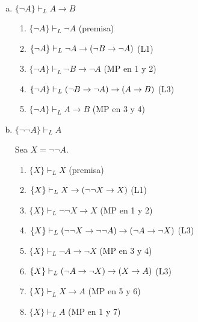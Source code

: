 \begin{enumerate}[(a)]
    \item $\{ \neg A \} \vdash_L A \to B$
    \begin{solution}
    \leavevmode
    \begin{enumerate}[1.]
        \item $\{ \neg A \} \vdash_L                 \neg A$  \hfill (premisa)
        \item $\{ \neg A \} \vdash_L \neg A \to (\neg B \to \neg A)$ \hfill (L1)
        \item $\{ \neg A \} \vdash_L      \neg B \to \neg A$  \hfill (MP en 1 y 2)
        \item $\{ \neg A \} \vdash_L (\neg B \to \neg A) \to (A \to B)$                  \hfill (L3)
        \item $\{ \neg A \} \vdash_L A \to B$                 \hfill (MP en 3 y 4)
    \end{enumerate}
    \end{solution}
    
    \item $\{ \neg \neg A \} \vdash_L A$
    \begin{solution}
    Sea $X = \neg \neg A$.
    \begin{enumerate}[1.]
        \item $\{ X \} \vdash_L X$                     \hfill (premisa)
        \item $\{ X \} \vdash_L X \to (\neg \neg X \to X)$   \hfill (L1)
        \item $\{ X \} \vdash_L {\neg \neg X} \to X$   \hfill (MP en 1 y 2)
        \item $\{ X \} \vdash_L (\neg \neg X \to \neg \neg A) \to (\neg A \to \neg X)$ \hfill (L3)
        \item $\{ X \} \vdash_L \neg A \to \neg X$     \hfill (MP en 3 y 4)
        \item $\{ X \} \vdash_L (\neg A \to \neg X) \to (X \to A)$                \hfill (L3)
        \item $\{ X \} \vdash_L X \to A$               \hfill (MP en 5 y 6)
        \item $\{ X \} \vdash_L A$                     \hfill (MP en 1 y 7)
    \end{enumerate}
    \end{solution}
    

\end{enumerate}
